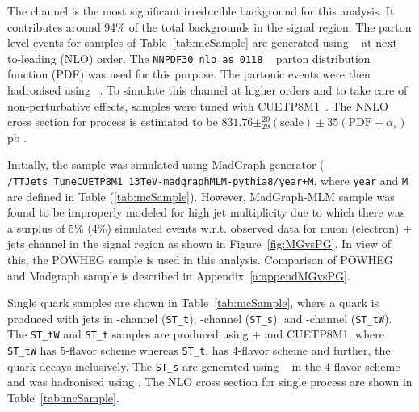 The \ttjets channel is the most significant irreducible background for this analysis. It
contributes around 94\% of the total backgrounds in the signal region. The parton level events 
for \ttjets samples of Table~\ref{tab:mcSample} are generated using 
\POWHEG~\cite{Frixione:2007vw, Nason:2004rx, Alioli:2010xd} at next-to-leading (NLO) order. The 
\verb|NNPDF30_nlo_as_0118| ~\cite{Ball:2014uwa} parton distribution function (PDF) was used 
for this purpose. The partonic events were then hadronised using 
\PYTHIA~\cite{Sjostrand:2006za, Sjostrand:2007gs}. To simulate this channel at higher orders and 
to take care of non-perturbative effects, \ttjets samples were tuned with 
CUETP8M1~\cite{CMS-PAS-TOP-16-021}. The NNLO cross section for \ttjets process is estimated to be 
$831.76 \pm^{20}_{29}(\text{scale}) \pm 35 (\text{PDF} + \alpha_s)$ pb \cite{Beneke:2011mq}. 

Initially, the \ttjets sample was simulated using MadGraph generator (\\ 
\verb|/TTJets_TuneCUETP8M1_13TeV-madgraphMLM-pythia8/year+M|, where \verb|year| and \verb|M| 
are defined in Table (\ref{tab:mcSample}). However, MadGraph-MLM sample was found to be 
improperly modeled for high jet multiplicity due to which there was a surplus of 5\% (4\%) 
simulated events w.r.t. observed data for muon (electron) + jets channel in the signal region as 
shown in Figure~\ref{fig:MGvsPG}. In view of this, the POWHEG \ttjets sample is used in this analysis.
Comparison of POWHEG and Madgraph \ttjets sample is described in Appendix~\ref{a:appendMGvsPG}.

Single \PQt quark samples are shown in Table~\ref{tab:mcSample}, where a \PQt quark is produced with 
jets in \PQt-channel (\verb|ST_t|), \PQs-channel (\verb|ST_s|), and \PQt\PW-channel (\verb|ST_tW|). The
\verb|ST_tW| and \verb|ST_t| samples are produced using \POWHEG + \PYTHIA and CUETP8M1, where \verb|ST_tW| has 
5-flavor scheme whereas \verb|ST_t|, has 4-flavor scheme and further, the \PQt quark decays 
inclusively. The \verb|ST_s| are generated using \MGvATNLO~\cite{Alwall:2014hca} in the 4-flavor 
scheme and was hadronised using \PYTHIA. The NLO cross section for single \PQt process 
\cite{Aliev:2010zk, Kant:2014oha} are shown in Table~\ref{tab:mcSample}.

